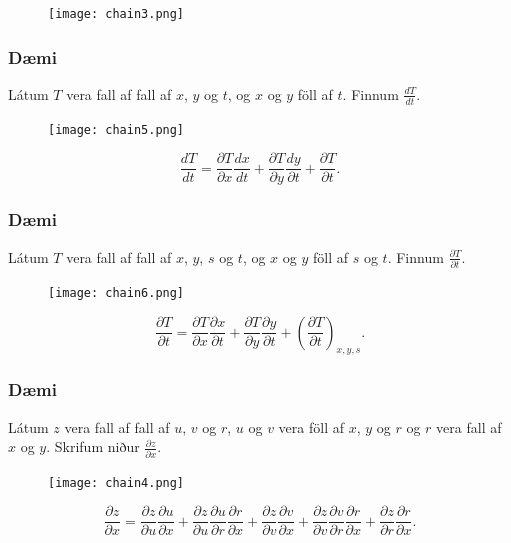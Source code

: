 \begin{figure}[h!]
           \centering
            \texttt{[image: chain3.png]}
	\caption*{}
    \end{figure}


\subsubsection{Dæmi }
Látum $T$ vera fall af fall af $x$, $y$ og $t$, og $x$ og $y$ föll af $t$. Finnum $\frac{ dT}{dt}$.

\begin{figure}[h!]
           \centering
            \texttt{[image: chain5.png]}
	\caption*{}
    \end{figure}
$$\frac{d T}{d t} = \frac{\partial T}{\partial x} \frac{d x}{d t} +\frac{\partial T}{\partial y} \frac{d y}{\partial t} + \frac{\partial T}{\partial t} .$$


\subsubsection{Dæmi }
Látum $T$ vera fall af fall af $x$, $y$, $s$ og $t$, og $x$ og $y$ föll af $s$ og $t$. Finnum $\frac{ \partial T}{\partial t}$.

\begin{figure}[h!]
           \centering
            \texttt{[image: chain6.png]}
	\caption*{}
    \end{figure}
$$\frac{\partial T}{\partial t} = \frac{\partial T}{\partial x} \frac{\partial x}{\partial t} +\frac{\partial T}{\partial y} \frac{\partial y}{\partial t} + \left(\frac{\partial T}{\partial t}\right)_{x,y,s} .$$


\subsubsection{Dæmi }
Látum $z$ vera fall af fall af $u$, $v$ og $r$, $u$ og $v$ vera föll af $x$, $y$ og $r$ og $r$ vera fall af $x$ og $y$. Skrifum niður $\frac{\partial z}{\partial x}$.

\begin{figure}[h!]
           \centering
            \texttt{[image: chain4.png]}
	\caption*{}
    \end{figure}
$$\frac{\partial z}{\partial x} = \frac{\partial z}{\partial u} \frac{\partial u}{\partial x} +\frac{\partial z}{\partial u} \frac{\partial u}{\partial r} \frac{\partial r}{\partial x} 
+ \frac{\partial z}{\partial v} \frac{\partial v}{\partial x} + \frac{\partial z}{\partial v} \frac{\partial v}{\partial r} \frac{\partial r}{\partial x} +\frac{\partial z}{\partial r} \frac{\partial r}{\partial x}.$$




